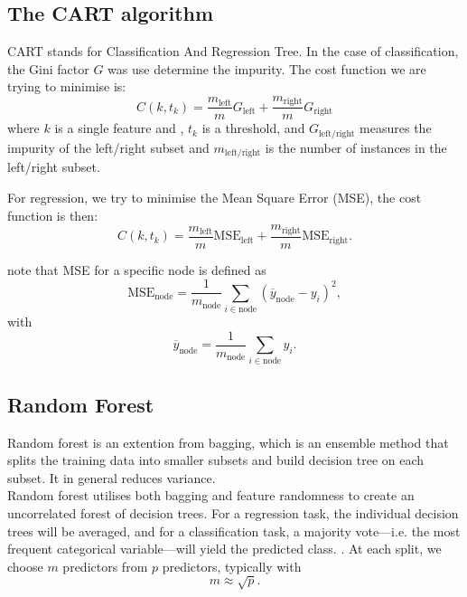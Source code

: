 \documentclass[english,notitlepage,reprint,nofootinbib]{revtex4-1}
\begin{document}
\subsection{The CART algorithm}\label{sub:cart}
CART stands for Classification And Regression Tree. In the case of classification, the Gini factor $ G $ was use determine the impurity. The cost function we are trying to minimise is:
\[ C(k,t_k) = \frac{m_{\mathrm{left}}}{m}G_{\mathrm{left}}+ \frac{m_{\mathrm{right}}}{m}G_{\mathrm{right}} \] 
where $ k $ is a single feature and , $ t_k $ is a threshold, and $G_{\mathrm{left/right}}$ measures the impurity of the left/right subset  and $m_{\mathrm{left/right}}$ is the number of instances in the left/right subset.

For regression, we try to minimise the Mean Square Error (MSE), the cost function is then:
\[C(k,t_k) = \frac{m_{\mathrm{left}}}{m}\mathrm{MSE}_{\mathrm{left}}+ \frac{m_{\mathrm{right}}}{m}\mathrm{MSE}_{\mathrm{right}}. \]

note that MSE for a specific node is defined as 
\[ \mathrm{MSE}_{\mathrm{node}}=\frac{1}{m_\mathrm{node}}\sum_{i\in \mathrm{node}}(\overline{y}_{\mathrm{node}}-y_i)^2, \] 
with 
\[ \overline{y}_{\mathrm{node}}=\frac{1}{m_\mathrm{node}}\sum_{i\in \mathrm{node}}y_i. \] \cite{hjorth-jensen}

\subsection{Random Forest}
Random forest is an extention from bagging, which is an ensemble method that splits the training data into smaller subsets and build decision tree on each subset. It in general reduces variance. \\ Random forest utilises both bagging and feature randomness to create an uncorrelated forest of decision trees. For a regression task, the individual decision trees will be averaged, and for a classification task, a majority vote—i.e. the most frequent categorical variable—will yield the predicted class. \cite{ibm}. 
At each split, we choose $ m $ predictors from $ p $ predictors, typically with
\[ m\approx \sqrt{p}. \] 
\end{document}
